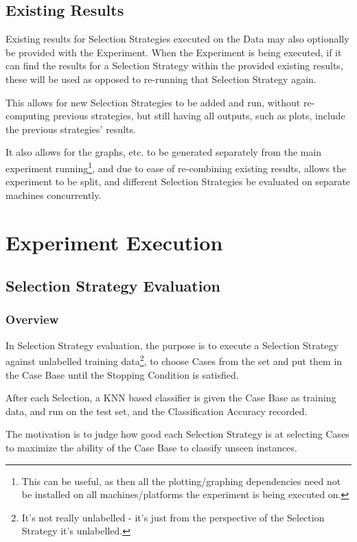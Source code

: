\documentclass[a4paper,11pt]{report}
\begin{document}
\subsection{Existing Results}
Existing results for Selection Strategies executed on the Data may also optionally be provided with the Experiment. When the Experiment is being executed, if it can find the results for a Selection Strategy within the provided existing results, these will be used as opposed to re-running that Selection Strategy again.

This allows for new Selection Strategies to be added and run, without re-computing previous strategies, but still having all outputs, such as plots, include the previous strategies' results.

It also allows for the graphs, etc. to be generated separately from the main experiment running\footnote{This can be useful, as then all the plotting/graphing dependencies need not be installed on all machines/platforms the experiment is being executed on.}, and due to ease of re-combining existing results, allows the experiment to be split, and different Selection Strategies be evaluated on separate machines concurrently.

\section{Experiment Execution}

\subsection{Selection Strategy Evaluation}
\subsubsection{Overview}
In Selection Strategy evaluation, the purpose is to execute a Selection Strategy against unlabelled training data\footnote{It's not really unlabelled - it's just from the perspective of the Selection Strategy it's unlabelled.}, to choose Cases from the set and put them in the Case Base until the Stopping Condition is satisfied.

After each Selection, a KNN based classifier is given the Case Base as training data, and run on the test set, and the Classification Accuracy recorded.

The motivation is to judge how good each Selection Strategy is at selecting Cases to maximize the ability of the Case Base to classify unseen instances.
\end{document}
